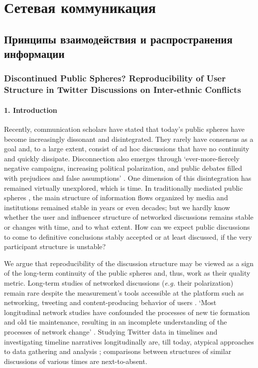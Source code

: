 \chapter{Сетевая коммуникация}\label{ch:ch3}

\section{Принципы взаимодействия и распространения информации}\label{sec:ch3/sec1}

\subsection{Discontinued Public Spheres? Reproducibility of User Structure in Twitter Discussions on Inter-ethnic Conflicts}\label{subsec:ch3/sec1/sub1}

\subsubsection{1. Introduction}\label{subsubsec:ch3/sec1/sub1/subsub1}

Recently, communication scholars have stated that today’s public spheres \cite{Habermas} have become increasingly dissonant \cite{Pfetsch} and disintegrated. They rarely have consensus as a goal and, to a large extent, consist of ad hoc discussions \cite{BrunsBurgess} that have no continuity and quickly dissipate. Disconnection also emerges through ‘ever-more-fiercely negative campaigns, increasing political polarization, and public debates filled with prejudices and false assumptions’ \cite[p.~59]{Pfetsch}. One dimension of this disintegration has remained virtually unexplored, which is time. In traditionally mediated public spheres \cite{Calhoun}, the main structure of information flows organized by media and institutions remained stable in years or even decades; but we hardly know whether the user and influencer structure of networked discussions remains stable or changes with time, and to what extent. How can we expect public discussions to come to definitive conclusions stably accepted or at least discussed, if the very participant structure is unstable?

We argue that reproducibility of the discussion structure may be viewed as a sign of the long-term continuity of the public spheres and, thus, work as their quality metric. Long-term studies of networked discussions (\textit{e.g.} their polarization) remain rare despite the measurement’s tools accessible at the platform such as networking, tweeting and content-producing behavior of users \cite{GarimellaWeber}. ‘Most longitudinal network studies have confounded the processes of new tie formation and old tie maintenance, resulting in an incomplete understanding of the processes of network change’ \cite{Fu}. Studying Twitter data in timelines and investigating timeline narratives longitudinally are, till today, atypical approaches to data gathering and analysis \cite{BrookerVinesBarnett}; comparisons between structures of similar discussions of various times are next-to-absent.

